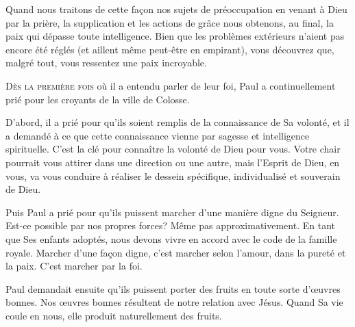 Quand nous traitons de cette façon nos sujets de préoccupation
 \ocadr en venant à Dieu par la prière, la supplication
 et les actions de grâce \fcadr{}
 nous obtenons, au final, la paix qui dépasse toute intelligence.
 Bien que les problèmes extérieurs n'aient pas encore été réglés
 (et aillent même peut-être en empirant), vous découvrez que, malgré tout,
 vous ressentez une paix incroyable.

\dvrule






\lettrine{D}{ès la première fois} où il a entendu parler de leur foi,
 Paul a continuellement prié pour les croyants de la ville de Colosse. 

D'abord, il a prié pour qu'ils soient remplis de la connaissance
 de Sa volonté, et il a demandé à ce que cette connaissance vienne
 par sagesse et intelligence spirituelle.
 C'est la clé pour connaître la volonté de Dieu pour vous.
 Votre chair pourrait vous attirer dans une direction ou une autre,
 mais l'Esprit de Dieu, en vous, va vous conduire à réaliser
 le dessein spécifique, individualisé et souverain de Dieu.


Puis Paul a prié pour qu'ils puissent marcher d'une manière digne du Seigneur.
 Est-ce possible par nos propres forces? Même pas approximativement.
 En tant que Ses enfants adoptés, nous devons vivre en accord
 avec le code de la famille royale. Marcher d'une façon digne,
 c'est marcher selon l'amour, dans la pureté et la paix.
 C'est marcher par la foi.

Paul demandait ensuite qu'ils puissent porter des fruits en toute sorte
 d'œuvres bonnes. Nos œuvres bonnes résultent de notre relation avec Jésus.
 Quand Sa vie coule en nous, elle produit naturellement des fruits.

